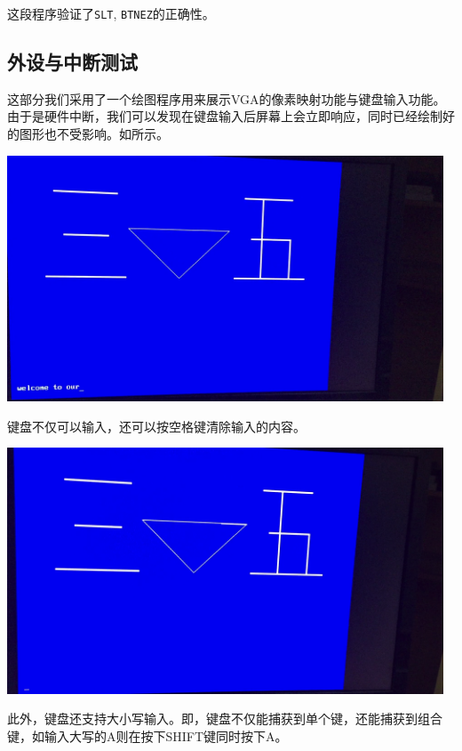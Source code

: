 这段程序验证了\texttt{SLT}, \texttt{BTNEZ}的正确性。

\subsection{外设与中断测试}

这部分我们采用了一个绘图程序用来展示VGA的像素映射功能与键盘输入功能。由于是硬件中断，我们可以发现在键盘输入后屏幕上会立即响应，同时已经绘制好的图形也不受影响。如所示。

\begin{center}
    \includegraphics[width=13cm]{image/testing/vga_keyboard}
    \label{fig:vga_keyboard}
\end{center}

键盘不仅可以输入，还可以按空格键清除输入的内容。

\begin{center}
    \includegraphics[width=13cm]{image/testing/clear}
\end{center}

此外，键盘还支持大小写输入。即，键盘不仅能捕获到单个键，还能捕获到组合键，如输入大写的A则在按下SHIFT键同时按下A。

